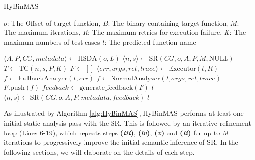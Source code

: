 \documentclass[acmsmall,screen,review,anonymous]{acmart} %
\begin{document}
\begin{algorithm}
  \caption{HyBinMAS}
  \label{alg:HyBinMAS}
  \begin{algorithmic}[1]
    \REQUIRE $o$: The Offset of target function, $B$: The binary containing target function, $M$: The maximum iterations, $R$: The maximum retries for execution failure, $K$: The maximum numbers of test cases
    \ENSURE $l$: The predicted function name

    \STATE $\langle A, P, CG, metadata \rangle \gets \text{HSDA}(o, L)$
    \STATE $\langle n, s \rangle \gets \text{SR}(CG, o, A, P, M, \text{NULL})$
        \STATE $T \gets \text{TG}(n, s, P, K)$
        \STATE $F \gets []$
            \STATE $\langle err, args, ret, trace \rangle \gets \text{Executor}(t, R)$
                \STATE $f \gets \text{FallbackAnalyer}(t, err)$
            \ELSE
                \STATE $f \gets \text{NormalAnalyzer}(t, args, ret, trace)$
            \ENDIF
            \STATE $F.\text{push}(f)$
        \ENDFOR
        \STATE $feedback \gets \text{generate\_feedback}(F)$
            \RETURN $l$
        \ENDIF
        \STATE $\langle n, s \rangle \gets \text{SR}(CG, o, A, P, metadata, feedback)$
    \ENDFOR
    \RETURN $l$
  \end{algorithmic}
\end{algorithm}

As illustrated by Algorithm \ref{alg:HyBinMAS}, HyBinMAS performs at least one initial static analysis pass with the SR. This is followed by an iterative refinement loop (Lines 6-19), which repeats steps \textbf{(\textit{iii})}, \textbf{(\textit{iv})}, \textbf{(\textit{v})} and \textbf{(\textit{ii})} for up to $M$ iterations to progressively improve the initial semantic inference of SR. In the following sections, we will elaborate on the details of each step.

\end{document}
